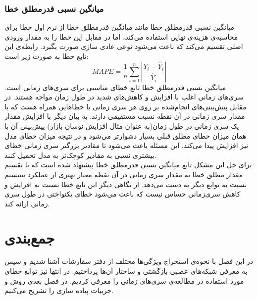 \subsubsection{میانگین نسبی قدرمطلق خطا}
میانگین نسبی قدرمطلق خطا مانند میانگین قدرمطلق خطا از نرم اول خطا برای محاسبه‌ی هزینه‌ی نهایی استفاده می‌کند، اما در مقابل این خطا را به مقدار ورودی اصلی تقسیم می‌کند که باعث می‌شود نوعی عادی سازی صورت بگیرد. رابطه‌ی این تابع خطا به صورت زیر است:
\begin{equation}
	MAPE = \dfrac{1}{n} \sum_{i=1}^{n}|\dfrac{Y_i - \hat{Y}_i}{\hat{Y}_i}|
\end{equation}
میانگین نسبی قدرمطلق خطا تابع خطای مناسبی برای سری‌های زمانی است. سری‌های زمانی اغلب با افزایش و کاهش‌های شدید در طول زمان مواجه هستند. در مقابل پیش‌بینی‌های انجام‌شده بر روی هر سری زمانی با خطاهایی همراه هست که با مقدار سری زمانی در آن نقطه نسبت مستقیمی دارند. به بیان دیگر با افزایش مقدار یک سری زمانی در طول زمان(به عنوان مثال افزایش نوسان بازار) پیش‌بینی آن با همان میزان خطای مطلق قبلی بسیار دشوارتر می‌شود و در نتیجه میزان خطای مدل نیز افزایش پیدا می‌کند. این مسئله باعث می‌شود تا مقادیر بزرگتر سری زمانی خطای بیشتری نسبی به مقادیر کوچک‌تر به مدل تحمیل کنند.\\
برای حل این مشکل تابع میانگین نسبی قدرمطلق خطا پیشنهاد شده است که با تقسیم مقدار مطلق خطا به مقدار سری زمانی در آن نقطه معیار بهتری از عملکرد سیستم نسبت به توابع دیگر به دست می‌دهد. از نگاهی دیگر این تابع خطا نسبت به افزایش و کاهش سری‌زمانی حساس نیست که باعث می‌شود خطای یکنواختی در طول سری زمانی ارائه کند. 
\newpage
\section{جمع‌بندی}
در این فصل با نحوه‌ی استخراج ویژگی‌ها مختلف از دفتر سفارشات آشنا شدیم و سپس به معرفی شبکه‌های عصبی بازگشتی و ساختار آن‌ها پرداختیم. در انتها نیز توابع خطای مورد استفاده در مطالعه‌ی سری‌های زمانی را معرفی کردیم. در فصل بعدی روش و جزییات پیاده سازی را تشریح می‌کنیم.

